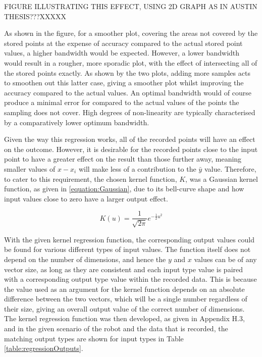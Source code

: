 \documentclass[11pt]{article}
\begin{document}
FIGURE ILLUSTRATING THIS EFFECT, USING 2D GRAPH AS IN AUSTIN THESIS???XXXXX

As shown in the figure, for a smoother plot, covering the areas not covered by the stored points at the expense of accuracy compared to the actual stored point values, a higher bandwidth would be expected. However, a lower bandwidth would result in a rougher, more sporadic plot, with the effect of intersecting all of the stored points exactly. As shown by the two plots, adding more samples acts to smoothen out this latter case, giving a smoother plot whilst improving the accuracy compared to the actual values. An optimal bandwidth would of course produce a minimal error for compared to the actual values of the points the sampling does not cover. High degrees of non-linearity are typically characterised by a comparatively lower optimum bandwidth.

Given the way this regression works, all of the recorded points will have an effect on the outcome. However, it is desirable for the recorded points close to the input point to have a greater effect on the result than those further away, meaning smaller values of $x - x_{i}$ will make less of a contribution to the $\bar{y}$ value. Therefore, to cater to this requirement, the chosen kernel function, $K$, was a Gaussian kernel function, as given in \eqref{equation:Gaussian}, due to its bell-curve shape and how input values close to zero have a larger output effect.

\begin{equation}\label{equation:Gaussian}
K(u) = \frac{1}{\sqrt{2\pi}}e^{-\frac{1}{2}u^2}
\end{equation}

With the given kernel regression function, the corresponding output values could be found for various different types of input values. The function itself does not depend on the number of dimensions, and hence the $y$ and $x$ values can be of any vector size, as long as they are consistent and each input type value is paired with a corresponding output type value within the recorded data. This is because the value used as an argument for the kernel function depends on an absolute difference between the two vectors, which will be a single number regardless of their size, giving an overall output value of the correct number of dimensions. The kernel regression function was then developed, as given in Appendix H.3, and in the given scenario of the robot and the data that is recorded, the matching output types are shown for input types in Table \ref{table:regressionOutputs}.
\end{document}
